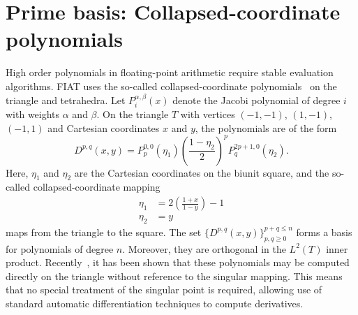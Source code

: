 \section{Prime basis: Collapsed-coordinate polynomials}
High order polynomials in floating-point arithmetic require stable
evaluation algorithms.  FIAT uses the so-called collapsed-coordinate
polynomials~\cite{KarShe99} on the triangle and tetrahedra.  Let
\(P^{\alpha,\beta}_i(x) \) denote the Jacobi polynomial of degree \( i
\) with weights \( \alpha \) and \( \beta \).
On the triangle \( T \)
with vertices \( (-1,-1) \), \((1,-1) \), \( (-1,1) \) and Cartesian coordinates \( x\) and \( y \), the
polynomials are of the form
\[
  D^{p,q}( x,y ) = P^{0,0}_{p}(\eta_1)  \left( \frac{1-\eta_2}{2}
  \right)^p P^{2p+1,0}_q(\eta_2).
\]
Here, \( \eta_1 \) and \( \eta_2 \) are the Cartesian coordinates on the biunit square, and the so-called collapsed-coordinate mapping
\[
\begin{split}
\eta_1 & = 2\left( \frac{1+x}{1-y} \right) - 1\\
\eta_2 & = y
\end{split}
\]
maps from the triangle to the square.
The set \( \{ D^{p,q}( x,y) \}_{p,q \geq 0}^{p+q\leq n} \)
forms a basis for polynomials of degree \( n \).  Moreover, they are
orthogonal in the \( L^2(T) \) inner product.
Recently~\cite{Kir09}, it has been shown that these polynomials
may be computed directly on the triangle without reference to the
singular mapping.  This means that no special treatment of the
singular point is required, allowing use of standard automatic
differentiation techniques to compute derivatives.


